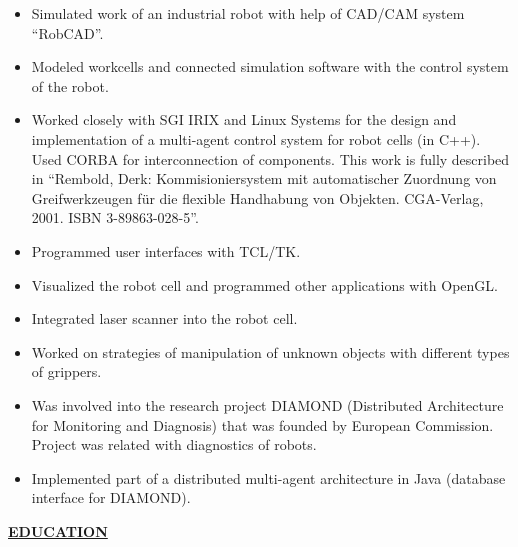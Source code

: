 \documentclass[a4paper,12pt,]{article}
\begin{document}
\begin{description}
    \begin{itemize}
      
    \item Simulated work of an industrial robot with help of CAD/CAM system ``RobCAD''.

    \item Modeled workcells and connected simulation software with the control system of the robot.

    \item Worked closely with SGI IRIX and Linux Systems for the design and implementation 
      of a multi-agent control system for robot cells (in C++). 
      Used CORBA for interconnection of components. This work is fully described
      in ``Rembold, Derk: Kommisioniersystem mit automatischer Zuordnung von Greifwerkzeugen
      f\"{u}r die flexible Handhabung von Objekten. CGA-Verlag, 2001. ISBN 3-89863-028-5''.

    \item Programmed user interfaces with TCL/TK.

    \item Visualized the robot cell and programmed other applications with OpenGL.

    \item Integrated laser scanner into the robot cell.

    \item Worked on strategies of manipulation of unknown objects with different types
      of grippers.

    \item Was involved into the research project DIAMOND (Distributed Architecture for 
      Monitoring and Diagnosis) that was
      founded by European Commission. Project was related with diagnostics of robots.

    \item Implemented part of a distributed multi-agent architecture in Java (database 
      interface for DIAMOND).

    \end{itemize}

  \end{description}

  \vspace{1ex}

  \uline{ \bfseries{EDUCATION} }
\end{document}
